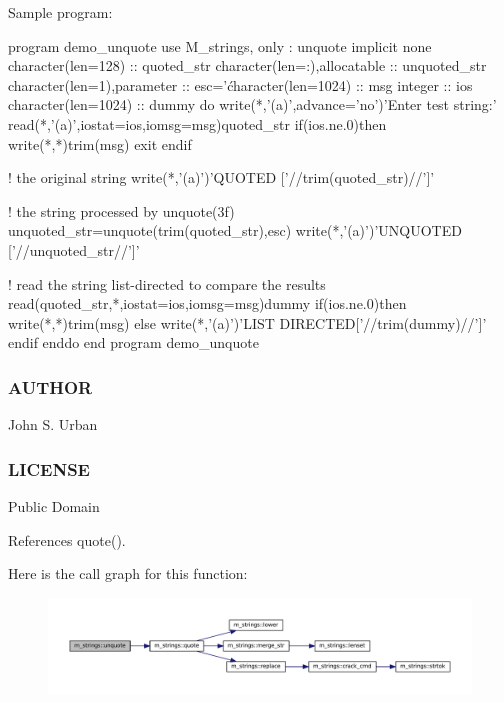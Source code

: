 Sample program\+: \begin{DoxyVerb}program demo_unquote
   use M_strings, only : unquote
   implicit none
   character(len=128)           :: quoted_str
   character(len=:),allocatable :: unquoted_str
   character(len=1),parameter   :: esc='\'
   character(len=1024)          :: msg
   integer                      :: ios
   character(len=1024)          :: dummy
   do
      write(*,'(a)',advance='no')'Enter test string:'
      read(*,'(a)',iostat=ios,iomsg=msg)quoted_str
      if(ios.ne.0)then
         write(*,*)trim(msg)
         exit
      endif

      ! the original string
      write(*,'(a)')'QUOTED       ['//trim(quoted_str)//']'

      ! the string processed by unquote(3f)
      unquoted_str=unquote(trim(quoted_str),esc)
      write(*,'(a)')'UNQUOTED     ['//unquoted_str//']'

      ! read the string list-directed to compare the results
      read(quoted_str,*,iostat=ios,iomsg=msg)dummy
      if(ios.ne.0)then
         write(*,*)trim(msg)
      else
         write(*,'(a)')'LIST DIRECTED['//trim(dummy)//']'
      endif
   enddo
end program demo_unquote
\end{DoxyVerb}


\subsubsection*{A\+U\+T\+H\+OR}

John S. Urban \subsubsection*{L\+I\+C\+E\+N\+SE}

Public Domain 

References quote().

Here is the call graph for this function\+:
\nopagebreak
\begin{figure}[H]
\begin{center}
\leavevmode
\includegraphics[width=350pt]{namespacem__strings_acb88c65d5df2d5b3e55df2d2dab57390_cgraph}
\end{center}
\end{figure}
\mbox{\label{namespacem__strings_a0953ac5c4d31339fdd8ec3acc9c3c915}} 
